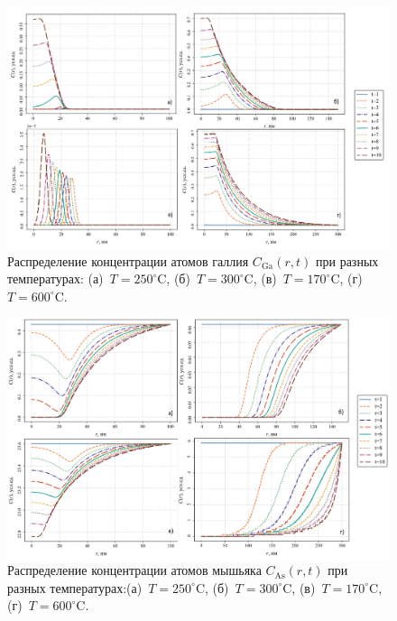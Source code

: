 \documentclass[14pt,oneside]{extarticle}
\begin{document}
\begin{figure}
    \begin{center}
    \includegraphics[width=18cm]{images/C_Ga_t.png}
    \caption{\label{fig:c_ga_t} Распределение концентрации атомов галлия $C_{\text{Ga}}(r, t)$ при разных температурах: (а)~$T=250^\circ$C, (б)~$T=300^\circ$C, (в)~$T=170^\circ$C, (г)~$T=600^\circ$C.}
    \end{center}
\end{figure}

\begin{figure}
    \begin{center}
    \includegraphics[width=18cm]{images/C_As_t.png}
    \caption{\label{fig:c_as_t} Распределение концентрации атомов мышьяка $C_{\text{As}}(r, t)$ при разных температурах:(а)~$T=250^\circ$C, (б)~$T=300^\circ$C, (в)~$T=170^\circ$C, (г)~$T=600^\circ$C.}
    \end{center}
\end{figure}
\end{document}
